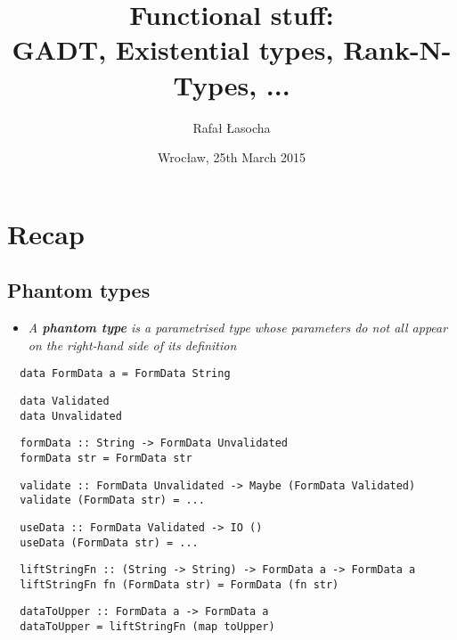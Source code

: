 \documentclass[aspectratio=43]{beamer}
\title{Functional stuff: \\
GADT, Existential types, Rank-N-Types, ...}
\author{Rafał Łasocha}
\date{Wrocław, 25th March 2015}
\begin{document}
  

\frame{\titlepage}


\section{Recap}

\subsection{Phantom types}

\begin{frame}[fragile]
 \begin{itemize}
  \item \textit{A \textbf{phantom type} is a parametrised type whose parameters do not all appear on the right-hand side of its definition}
 \end{itemize}
\end{frame}

\begin{frame}[fragile]
 \begin{lstlisting}
  data FormData a = FormData String
 \end{lstlisting}
 \pause
 \begin{lstlisting}
  data Validated
  data Unvalidated
 \end{lstlisting}
 \pause
 \begin{lstlisting}
  formData :: String -> FormData Unvalidated
  formData str = FormData str
 \end{lstlisting}
 \pause
 \begin{lstlisting}
  validate :: FormData Unvalidated -> Maybe (FormData Validated)
  validate (FormData str) = ...
 \end{lstlisting}
 \pause
 \begin{lstlisting}
  useData :: FormData Validated -> IO ()
  useData (FormData str) = ...
 \end{lstlisting}
 \pause
 \begin{lstlisting}
  liftStringFn :: (String -> String) -> FormData a -> FormData a
  liftStringFn fn (FormData str) = FormData (fn str)
 \end{lstlisting}
 \pause
 \begin{lstlisting}
  dataToUpper :: FormData a -> FormData a
  dataToUpper = liftStringFn (map toUpper)
 \end{lstlisting}
\end{frame}
\end{document}
